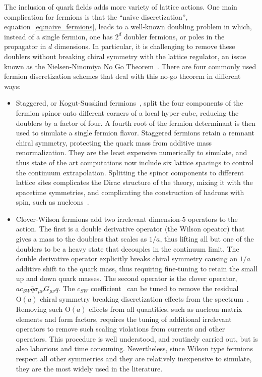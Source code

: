 The inclusion of quark fields adds more variety of lattice actions.
One main complication for fermions is that the ``naive discretization'', equation~\eqref{eq:naive_fermions}, leads to a well-known doubling problem in which, instead of a single fermion, one has $2^d$ doubler fermions, or poles in the propagator in $d$ dimensions.
In particular, it is challenging to remove these doublers without breaking chiral symmetry with the lattice regulator, an issue known as the Nielsen-Ninomiya No Go Theorem~\cite{Nielsen:1981hk,Nielsen:1980rz,Nielsen:1981xu}.
There are four commonly used fermion discretization schemes that deal with this no-go theorem in different ways:
\begin{itemize}[leftmargin=*]
\item Staggered, or Kogut-Susskind fermions~, split the four components of the fermion spinor onto different corners of a local hyper-cube, reducing the doublers by a factor of four.  A fourth root of the fermion determinant is then used to simulate a single fermion flavor.  Staggered fermions retain a remnant chiral symmetry, protecting the quark mass from additive mass renormalization.  They are the least expensive numerically to simulate, and thus state of the art computations now include six lattice spacings to control the continuum extrapolation.  Splitting the spinor components to different lattice sites complicates the Dirac structure of the theory, mixing it with the spacetime symmetries, and complicating the construction of hadrons with spin, such as nucleons~.

\item Clover-Wilson fermions add two irrelevant dimension-5 operators to the action.  The first is a double derivative operator (the Wilson opeator) that gives a mass to the doublers that scales as $1/a$, thus lifting all but one of the doublers to be a heavy state that decouples in the continuum limit.  The double derivative operator explicitly breaks chiral symmetry causing an $1/a$ additive shift to the quark mass, thus requiring fine-tuning to retain the small up and down quark masses.
The second operator is the clover operator, $a c_{SW} \bar{q} \sigma_{\mu\nu} G_{\mu\nu} q$.  The $c_{SW}$ coefficient~ can be tuned to remove the residual $\mathrm{O}(a)$ chiral symmetry breaking discretization effects from the spectrum~.  Removing such $\mathrm{O}(a)$ effects from all quantities, such as nucleon matrix elements and form factors, requires the tuning of additional irrelevant operators to remove such scaling violations from currents and other operators.  This procedure is well understood, and routinely carried out, but is also laborious and time consuming.  Nevertheless, since Wilson type fermions respect all other symmetries and they are relatively inexpensive to simulate, they are the most widely used in the literature.


\end{itemize}
